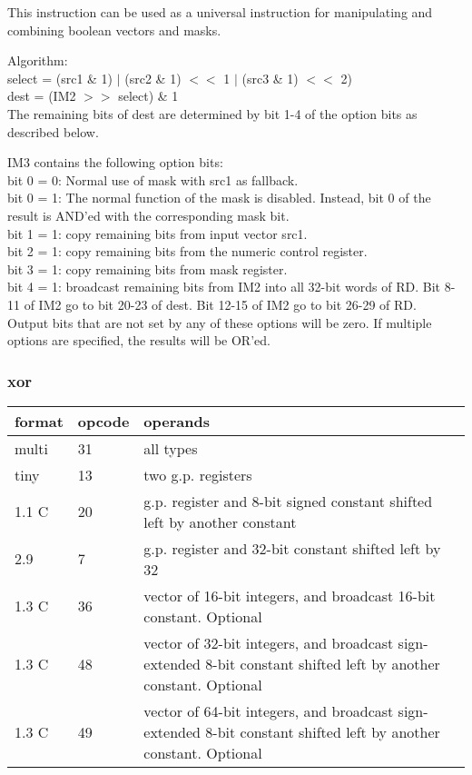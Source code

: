 \documentclass[forwardcom.tex]{subfiles}
\begin{document}
This instruction can be used as a universal instruction for manipulating and combining boolean vectors and masks.
\vspace{2mm}

Algorithm:\\
select = (src1 \& 1) $|$ (src2 \& 1) $<<$ 1 $|$ (src3 \& 1) $<<$ 2) \\
dest = (IM2 $>>$ select) \& 1 \\
The remaining bits of dest are determined by bit 1-4 of the option bits as described below.
\vspace{2mm}

IM3 contains the following option bits: \\
bit 0 = 0: Normal use of mask with src1 as fallback. \\
bit 0 = 1: The normal function of the mask is disabled. Instead, bit 0 of the result is AND'ed with the corresponding mask bit. \\
bit 1 = 1: copy remaining bits from input vector src1. \\
bit 2 = 1: copy remaining bits from the numeric control register. \\
bit 3 = 1: copy remaining bits from mask register. \\
bit 4 = 1: broadcast remaining bits from IM2 into all 32-bit words of RD. 
           Bit 8-11 of IM2 go to bit 20-23 of dest. Bit 12-15 of IM2 go to bit 26-29 of RD. \\
Output bits that are not set by any of these options will be zero. 
If multiple options are specified, the results will be OR'ed.


\subsubsection{xor}
\label{table:xorInstruction}
\begin{tabular}{|p{12mm}|p{12mm}|p{110mm}|}
\hline
\bfseries format & \bfseries opcode & \bfseries operands \\ \hline
multi & 31 & all types \\ \hline
tiny  & 13 & two g.p. registers \\ \hline
1.1 C & 20 & g.p. register and 8-bit signed constant shifted left by another constant \\ \hline
2.9   &  7 & g.p. register and 32-bit constant shifted left by 32 \\ \hline
1.3 C & 36 & vector of 16-bit integers, and broadcast 16-bit constant. Optional \\ \hline
1.3 C & 48 & vector of 32-bit integers, and broadcast sign-extended 8-bit constant shifted left by another constant. Optional \\ \hline
1.3 C & 49 & vector of 64-bit integers, and broadcast sign-extended 8-bit constant shifted left by another constant. Optional \\ \hline
\end{tabular}
\vspace{2mm}
\end{document}
